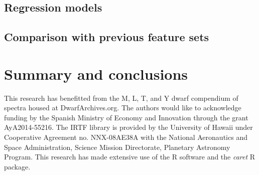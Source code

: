 \documentclass[printer]{aa}
\begin{document}
\subsection{Regression models}

\subsection{Comparison with previous feature sets}


\section{Summary and conclusions}
\label{sec:summary}


\begin{acknowledgements}
This research has benefitted from the M, L, T, and Y dwarf compendium
of spectra housed at DwarfArchives.org.  The authors would like to
acknowledge funding by the Spanish Ministry of Economy and Innovation
through the grant AyA2014-55216. The IRTF library is provided by the
University of Hawaii under Cooperative Agreement no. NNX-08AE38A with
the National Aeronautics and Space Administration, Science Mission
Directorate, Planetary Astronomy Program. This research has made
extensive use of the R software \cite{R} and the {\it caret} R
package.
\end{acknowledgements}


{}


\begin{appendix}
\label{app}



\end{appendix}
\end{document}
